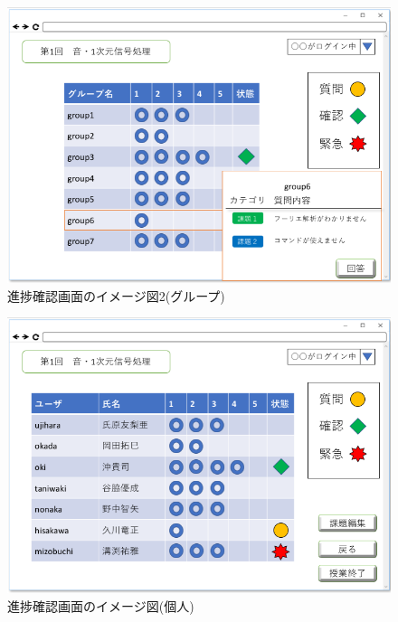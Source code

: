 \begin{figure}[phtbp]
  \begin{center}
    \includegraphics[width=1\linewidth,clip]{./img/21.png}
    \caption{進捗確認画面のイメージ図2(グループ)}\label{fig:21}
  \end{center}
\end{figure}

\begin{figure}[phtbp]
  \begin{center}
    \includegraphics[width=1\linewidth,clip]{./img/22.png}
    \caption{進捗確認画面のイメージ図(個人)}\label{fig:22}
  \end{center}
\end{figure}

